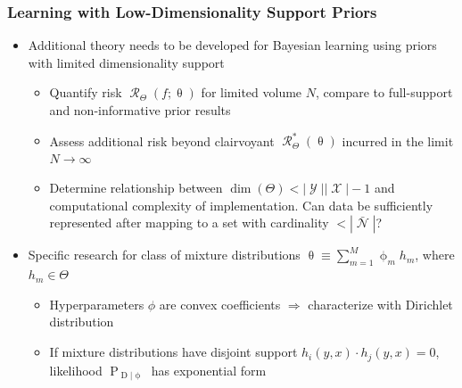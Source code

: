\documentclass[aspectratio=169,usenames,dvipsnames]{beamer}
\DeclareMathOperator{\Drm}{\mathrm{D}}
\DeclareMathOperator{\Prm}{\mathrm{P}}
\DeclareMathOperator{\Xcal}{\mathcal{X}}
\DeclareMathOperator{\Ycal}{\mathcal{Y}}
\DeclareMathOperator{\Dcal}{\mathcal{D}}
\DeclareMathOperator{\Ncal}{\mathcal{N}}
\DeclareMathOperator{\Rcal}{\mathcal{R}}
\begin{document}
\begin{frame}
\frametitle{Learning with Low-Dimensionality Support Priors}

\begin{itemize}
\item Additional theory needs to be developed for Bayesian learning using priors with limited dimensionality support
\vspace{0.25em}
	\vspace{0.25em}
	\begin{itemize}
	\item Quantify risk $\Rcal_{\Theta}(f ; \uptheta)$ for \alert{limited volume $N$}, compare to full-support and non-informative prior results
	\vspace{0.25em}
	\item Assess additional risk beyond clairvoyant $\Rcal_{\Theta}^*(\uptheta)$ incurred in the limit $N \to \infty$
	\vspace{0.25em}
	\item Determine relationship between $\dim(\Theta) < |\Ycal||\Xcal| - 1$ and \alert{computational complexity} of implementation. Can data be sufficiently represented after mapping to a set with cardinality $< |\bar{\Ncal}|$?
	\end{itemize}
\vspace{0.5em}
\item Specific research for class of mixture distributions $\uptheta \equiv \sum_{m = 1}^M \upphi_m h_m$, where $h_m \in \Theta$
	\vspace{0.25em}
	\begin{itemize}
	\item Hyperparameters $\phi$ are convex coefficients $\Rightarrow$ characterize with Dirichlet distribution
	\vspace{0.25em}
	\item If mixture distributions have disjoint support $h_i(y,x) \cdot h_j(y,x) = 0$, likelihood $\Prm_{\Drm | \upphi}$ has \alert{exponential form}
	\end{itemize}

\end{itemize}

\end{frame}
\end{document}
